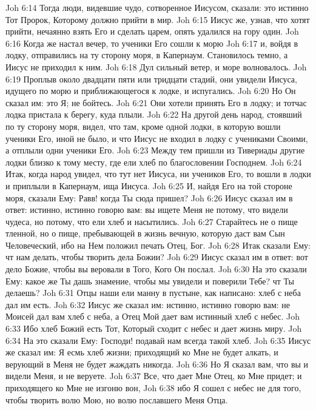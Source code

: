 \vs Joh 6:14 Тогда люди, видевшие чудо, сотворенное Иисусом, сказали: это истинно Тот Пророк, Которому должно прийти в мир.
\vs Joh 6:15 Иисус же, узнав, что хотят прийти, нечаянно взять Его и сделать царем, опять удалился на гору один.
\rsbpar\vs Joh 6:16 Когда же настал вечер, то ученики Его сошли к морю
\vs Joh 6:17 и, войдя в лодку, отправились на ту сторону моря, в Капернаум. Становилось темно, а Иисус не приходил к ним.
\vs Joh 6:18 Дул сильный ветер, и море волновалось.
\vs Joh 6:19 Проплыв около двадцати пяти или тридцати стадий, они увидели Иисуса, идущего по морю и приближающегося к лодке, и испугались.
\vs Joh 6:20 Но Он сказал им: это Я; не бойтесь.
\vs Joh 6:21 Они хотели принять Его в лодку; и тотчас лодка пристала к берегу, куда плыли.
\rsbpar\vs Joh 6:22 На другой день народ, стоявший по ту сторону моря, видел, что там, кроме одной лодки, в которую вошли ученики Его, иной не было, и что Иисус не входил в лодку с учениками Своими, а отплыли одни ученики Его.
\vs Joh 6:23 Между тем пришли из Тивериады другие лодки близко к тому месту, где ели хлеб по благословении Господнем.
\vs Joh 6:24 Итак, когда народ увидел, что тут нет Иисуса, ни учеников Его, то вошли в лодки и приплыли в Капернаум, ища Иисуса.
\vs Joh 6:25 И, найдя Его на той стороне моря, сказали Ему: Равв! когда Ты сюда пришел?
\vs Joh 6:26 Иисус сказал им в ответ: истинно, истинно говорю вам: вы ищете Меня не потому, что видели чудеса, но потому, что ели хлеб и насытились.
\vs Joh 6:27 Старайтесь не о пище тленной, но о пище, пребывающей в жизнь вечную, которую даст вам Сын Человеческий, ибо на Нем положил печать  Отец, Бог.
\vs Joh 6:28 Итак сказали Ему: чт нам делать, чтобы творить дела Божии?
\vs Joh 6:29 Иисус сказал им в ответ: вот дело Божие, чтобы вы веровали в Того, Кого Он послал.
\vs Joh 6:30 На это сказали Ему: какое же Ты дашь знамение, чтобы мы увидели и поверили Тебе? чт Ты делаешь?
\vs Joh 6:31 Отцы наши ели манну в пустыне, как написано: хлеб с неба дал им есть.
\vs Joh 6:32 Иисус же сказал им: истинно, истинно говорю вам: не Моисей дал вам хлеб с неба, а Отец Мой дает вам истинный хлеб с небес.
\vs Joh 6:33 Ибо хлеб Божий есть Тот, Который сходит с небес и дает жизнь миру.
\vs Joh 6:34 На это сказали Ему: Господи! подавай нам всегда такой хлеб.
\vs Joh 6:35 Иисус же сказал им: Я есмь хлеб жизни; приходящий ко Мне не будет алкать, и верующий в Меня не будет жаждать никогда.
\vs Joh 6:36 Но Я сказал вам, что вы и видели Меня, и не веруете.
\vs Joh 6:37 Все, что дает Мне Отец, ко Мне придет; и приходящего ко Мне не изгоню вон,
\vs Joh 6:38 ибо Я сошел с небес не для того, чтобы творить волю Мою, но волю пославшего Меня Отца.
